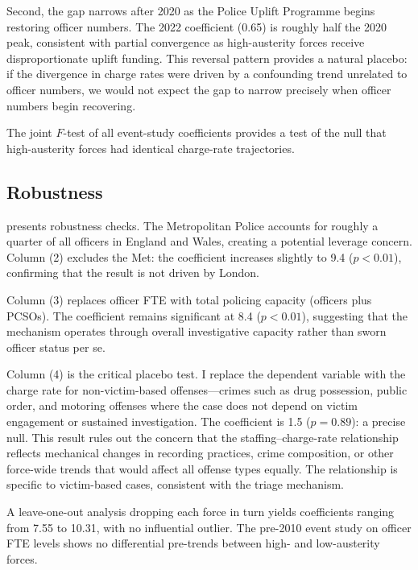 \documentclass[12pt]{article}
\begin{document}
Second, the gap narrows after 2020 as the Police Uplift Programme begins restoring officer numbers. The 2022 coefficient (0.65) is roughly half the 2020 peak, consistent with partial convergence as high-austerity forces receive disproportionate uplift funding. This reversal pattern provides a natural placebo: if the divergence in charge rates were driven by a confounding trend unrelated to officer numbers, we would not expect the gap to narrow precisely when officer numbers begin recovering.

The joint $F$-test of all event-study coefficients provides a test of the null that high-austerity forces had identical charge-rate trajectories.



\subsection{Robustness}

 presents robustness checks. The Metropolitan Police accounts for roughly a quarter of all officers in England and Wales, creating a potential leverage concern. Column (2) excludes the Met: the coefficient increases slightly to 9.4 ($p < 0.01$), confirming that the result is not driven by London.

Column (3) replaces officer FTE with total policing capacity (officers plus PCSOs). The coefficient remains significant at 8.4 ($p < 0.01$), suggesting that the mechanism operates through overall investigative capacity rather than sworn officer status per se.

Column (4) is the critical placebo test. I replace the dependent variable with the charge rate for non-victim-based offenses---crimes such as drug possession, public order, and motoring offenses where the case does not depend on victim engagement or sustained investigation. The coefficient is 1.5 ($p = 0.89$): a precise null. This result rules out the concern that the staffing--charge-rate relationship reflects mechanical changes in recording practices, crime composition, or other force-wide trends that would affect all offense types equally. The relationship is specific to victim-based cases, consistent with the triage mechanism.

A leave-one-out analysis dropping each force in turn yields coefficients ranging from 7.55 to 10.31, with no influential outlier. The pre-2010 event study on officer FTE levels shows no differential pre-trends between high- and low-austerity forces.
\end{document}
